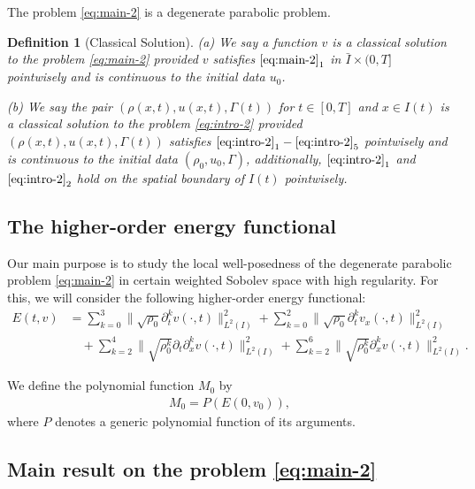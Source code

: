 \documentclass[11pt, reqno]{amsart}
\newtheorem{definition}{Definition}
\numberwithin{equation}{section}
\begin{document}
 The problem \eqref{eq:main-2} is a degenerate parabolic problem.

\begin{definition}[Classical Solution]\label{Classical Solution} {\rm{(a)}} We say a function \(v\)  
	is a classical solution to the problem \eqref{eq:main-2}  provided  \(v\) satisfies  \(\eqref{eq:main-2}_1\) in \(\bar{I}\times (0,T]\) pointwisely and is continuous to the initial data \(u_0\).	
	
{\rm{(b)}} We say the pair  \((\rho(x,t), u(x,t), \Gamma(t))\) for \(t\in[0,T]\) and \(x\in I(t)\)  
	is a classical solution to the problem \eqref{eq:intro-2} provided  \((\rho(x,t), u(x,t), \Gamma(t))\) satisfies  \(\eqref{eq:intro-2}_1-\eqref{eq:intro-2}_5\) pointwisely  and is continuous to the initial data \((\rho_0, u_0, \Gamma)\), additionally, \(\eqref{eq:intro-2}_1\) and \(\eqref{eq:intro-2}_2\) hold on the spatial boundary of \(I(t)\) pointwisely. 

\end{definition}


\subsection{The higher-order energy functional}


Our main purpose is to study the local well-posedness of the degenerate parabolic problem \eqref{eq:main-2} in certain weighted Sobolev space with high regularity. For this, we will consider the following higher-order energy functional:
\begin{equation}\label{higher-order energy function}
\begin{aligned}
E(t,v)&=\sum_{k=0}^3\|\sqrt{\rho_0}\partial_t^kv(\cdot,t)\|_{L^2(I)}^2
+\sum_{k=0}^2\|\sqrt{\rho_0}\partial_t^kv_x(\cdot,t)\|_{L^2(I)}^2\\
&\quad+\sum_{k=2}^4\big\|\sqrt{\rho_0^k}\partial_t\partial_x^kv(\cdot,t)\big\|_{L^2(I)}^2
+\sum_{k=2}^6\big\|\sqrt{\rho_0^k}\partial_x^kv(\cdot,t)\big\|_{L^2(I)}^2.
\end{aligned}
\end{equation}

We define the polynomial function \(M_0\) by
\begin{align*}
M_0=P(E(0,v_0)),
\end{align*}
where \(P\) denotes a generic polynomial function of its arguments. 



\subsection{Main result on the problem \eqref{eq:main-2}}
\end{document}
